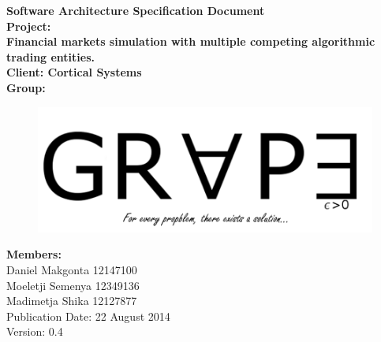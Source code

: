 \documentclass[12pt]{article}
\newcommand{\Title}{Software Architecture Specification Document} %
\begin{document}
	\begin{center}%
		\LARGE \bf \Title \\[2em]
		\Large {Project:}\\
		Financial markets simulation with multiple competing algorithmic trading entities.\\[0.7em]
		\Large {Client:}
		Cortical Systems\\[2em]
		\LARGE {\bf Group:}\\
			\begin{figure}[ht!]
				\centering
				\includegraphics[scale=0.4]{Logo8.png}
			\end{figure}
			
		\Large {\bf Members:}\\[0.3em]
		\large
		Daniel Makgonta 12147100\\
		Moeletji Semenya 12349136\\
		Madimetja Shika 12127877\\[3em]
	
	\small Publication Date: 22 August 2014\\[0.5em]
	\small Version: 0.4		    
	\end{center}%
	
\end{document}
